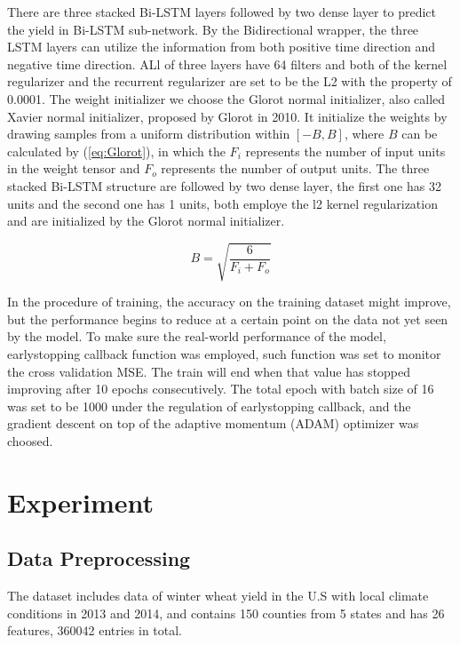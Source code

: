 \documentclass[conference, a4paper]{IEEEtran}
\begin{document}
      There are three stacked Bi-LSTM layers followed by two dense layer to predict the yield in Bi-LSTM sub-network. By the Bidirectional wrapper, the three LSTM layers can utilize the information from both positive time direction and negative time direction. ALl of three layers have 64 filters and both of the kernel regularizer and the recurrent regularizer are set to be the L2 with the property of 0.0001. The weight initializer we choose the Glorot normal initializer, also called Xavier normal initializer, proposed by Glorot in 2010\cite{glorotUnderstandingDifficultyTraining2010}. It initialize the weights by drawing samples from a uniform distribution within $[-B, B]$, where $B$ can be calculated by (\ref{eq:Glorot}), in which the $F_{i}$ represents the number of input units in the weight tensor and $F_o$ represents the number of output units. The three stacked Bi-LSTM structure are followed by two dense layer, the first one has 32 units and the second one has 1 units, both employe the l2 kernel regularization and are initialized by the Glorot normal initializer.
      
      \begin{equation}
        B = \sqrt{\frac{6}{F_{i} + F_{o}}}
        \label{eq:Glorot}
      \end{equation}

      In the procedure of training, the accuracy on the training dataset might improve, but the performance begins to reduce at a certain point on the data not yet seen by the model. To make sure the real-world performance of the model, earlystopping callback function was employed, such function was set to monitor the cross validation MSE. The train will end when that value has stopped improving after 10 epochs consecutively. The total epoch with batch size of 16 was set to be 1000 under the regulation of earlystopping callback, and the gradient descent on top of the adaptive momentum (ADAM) optimizer was choosed.

\section{Experiment} \label{sec:ex}
  \subsection{Data Preprocessing} 
    The dataset includes data of winter wheat yield in the U.S with local climate conditions in 2013 and 2014, and contains 150 counties from 5 states and has 26 features, 360042 entries in total.
\end{document}
